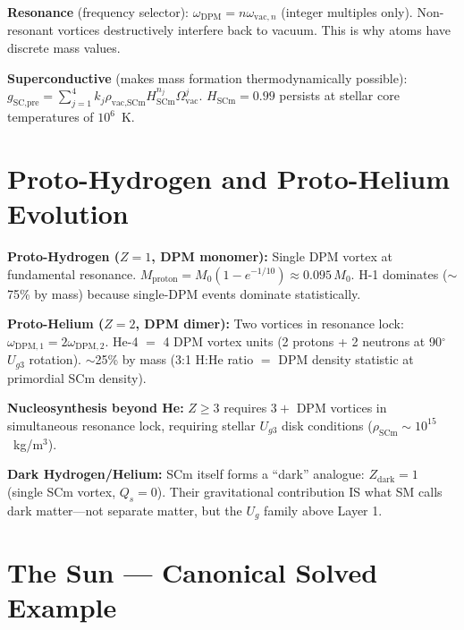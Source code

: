 \documentclass[12pt,a4paper]{article}
\begin{document}
\noindent\textbf{Resonance} (frequency selector):
$\omega_{\text{DPM}} = n\omega_{\text{vac},n}$ (integer multiples only).
Non-resonant vortices destructively interfere back to vacuum.
This is why atoms have discrete mass values.

\noindent\textbf{Superconductive} (makes mass formation thermodynamically possible):
$g_{\text{SC,pre}} = \sum_{j=1}^4 k_j \rho_{\text{vac,SCm}} H_{\text{SCm}}^{n_j} \Omega_{\text{vac}}^j$.
$H_{\text{SCm}} = 0.99$ persists at stellar core temperatures of $10^6$~K.

\section{Proto-Hydrogen and Proto-Helium Evolution}
\label{sec:nucleosynthesis}

\noindent\textbf{Proto-Hydrogen ($Z=1$, DPM monomer):}
Single DPM vortex at fundamental resonance.
$M_{\text{proton}} = M_0(1-e^{-1/10}) \approx 0.095\,M_0$.
H-1 dominates ($\sim$75\% by mass) because single-DPM events dominate statistically.

\noindent\textbf{Proto-Helium ($Z=2$, DPM dimer):}
Two vortices in resonance lock: $\omega_{\text{DPM},1} = 2\omega_{\text{DPM},2}$.
He-4 $=$ 4 DPM vortex units (2 protons + 2 neutrons at 90$^\circ$ $U_{g3}$ rotation).
$\sim$25\% by mass (3:1 H:He ratio $=$ DPM density statistic at primordial SCm density).

\noindent\textbf{Nucleosynthesis beyond He:}
$Z \geq 3$ requires $3+$ DPM vortices in simultaneous resonance lock,
requiring stellar $U_{g3}$ disk conditions
($\rho_{\text{SCm}} \sim 10^{15}$~kg/m$^3$).

\noindent\textbf{Dark Hydrogen/Helium:}
SCm itself forms a ``dark'' analogue: $Z_{\text{dark}}=1$ (single SCm vortex, $Q_s=0$).
Their gravitational contribution IS what SM calls dark matter---not separate matter,
but the $U_g$ family above Layer 1.

\section{The Sun --- Canonical Solved Example}
\label{sec:sun}
\end{document}
